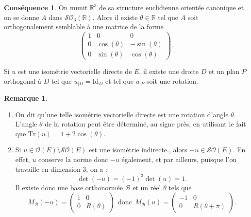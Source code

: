 \documentclass[french]{article}
\newcommand{\R}{\mathbb{R}}
\newcommand{\Tr}{\text{Tr}}
\theoremstyle{plain}
\theoremstyle{definition}
\newtheorem*{rmq}{Remarque}
\newtheorem*{conséquence}{Conséquence}
\theoremstyle{remark}
\begin{document}
\begin{conséquence}
	On munit $\R^3$ de sa structure euclidienne orientée canonique et on se donne $A$ dans $\mathcal{SO}_3(\R)$. Alors il existe $\theta\in\R$ tel que $A$ soit orthogonalement semblable à une matrice de la forme $$\begin{pmatrix}
	1&0&0\\
	0&\cos(\theta)&-\sin(\theta)\\
	0&\sin(\theta)&\cos(\theta)
\end{pmatrix}.$$
\end{conséquence}

\begin{cor}
	Si $u$ est une isométrie vectorielle directe de $E$, il existe une droite $D$ et un plan $P$ orthogonal à $D$ tel que $u_{\mid D}=\text{Id}_{D}$ et tel que $u_{\mid P}$ soit une rotation.
\end{cor}

\begin{rmq}
	\begin{enumerate}
		\item On dit qu'une telle isométrie vectorielle directe est une rotation d'angle $\theta$. L'angle $\theta$ de la rotation peut être déterminé, au signe près, en utilisant le fait que $\Tr(u)=1+2\cos(\theta)$.
		\item Si $u\in\mathcal{O}(E)\setminus\mathcal{SO}(E)$ est une isométrie indirecte., alors $-u\in\mathcal{SO}(E)$. En effet, $u$ conserve la norme donc $-u$ également, et par ailleurs, puisque l'on travaille en dimension $3$, on a : $$\det(-u)=(-1)^3\det(u)=1.$$ Il existe donc une base orthonormée $\mathcal{B}$ et un réel $\theta$ tels que $$M_\mathcal{B}(-u)=\begin{pmatrix}
			1&0\\
			0&R(\theta)
		\end{pmatrix} \ \ \text{donc}\ \ M_\mathcal{B}(u)=\begin{pmatrix}
		-1&0\\
		0&R(\theta+\pi)
		\end{pmatrix}.$$
	\end{enumerate}
\end{rmq}
\end{document}
